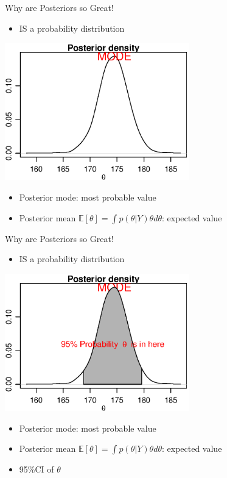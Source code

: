 \documentclass[presentation,9pt,xcolor=dvipsnames]{beamer}
\begin{document}
\begin{frame}[label={sec:org45d1065}]{Why are Posteriors so Great!}
\begin{itemize}
\item IS a probability distribution
\end{itemize}
\begin{center}
\includegraphics[width=0.6\textwidth,height=0.6\textheight]{posterior2.eps}
\end{center}
\begin{itemize}
\item Posterior mode: most probable value
\item Posterior mean \(\mathbb{E}[\theta]=\int p(\theta\vert Y)\theta d\theta\): expected value
\end{itemize}
\end{frame}
\begin{frame}[label={sec:org81ac780}]{Why are Posteriors so Great!}
\begin{itemize}
\item IS a probability distribution
\end{itemize}
\begin{center}
\includegraphics[width=0.6\textwidth,height=0.6\textheight]{posterior3.eps}
\end{center}
\begin{itemize}
\item Posterior mode: most probable value
\item Posterior mean \(\mathbb{E}[\theta]=\int p(\theta\vert Y)\theta d\theta\): expected value
\item 95\%CI of \(\theta\)
\end{itemize}
\end{frame}
\end{document}
